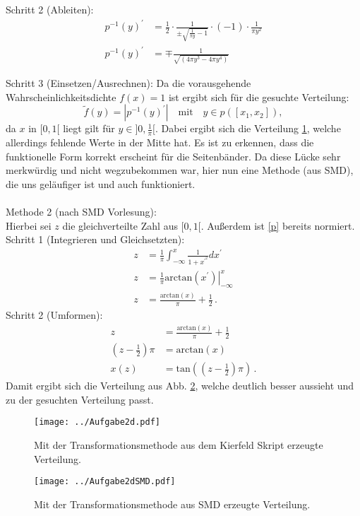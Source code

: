Schritt 2 (Ableiten):
\begin{align*}
	p^{-1}(y)^{'} &= \frac{1}{2} \cdot \frac{1}{\pm \sqrt{\frac{1}{\pi y} - 1}} \cdot (-1) \cdot \frac{1}{\pi y^2}\\
	p^{-1}(y)^{'} &= \mp \frac{1}{\sqrt{(4\pi y^3-4\pi y^4)}}
\end{align*}

Schritt 3 (Einsetzen/Ausrechnen):
Da die vorausgehende Wahrscheinlichkeitsdichte $f(x) = 1$ ist ergibt sich für die gesuchte Verteilung:
\begin{equation*}
	\tilde{f}(y) = |p^{-1}(y)^{'}| \quad \text{mit} \quad y \in p([x_1,x_2]),
\end{equation*}
da $x$ in $[0,1[$ liegt gilt für $y \in ]0, \frac{1}{\pi}[$.
Dabei ergibt sich die Verteilung \ref{2d1}, welche allerdings fehlende Werte in der Mitte hat.
Es ist zu erkennen, dass die funktionelle Form korrekt erscheint für die Seitenbänder.
Da diese Lücke sehr merkwürdig und nicht wegzubekommen war, hier nun eine Methode (aus SMD), die uns geläufiger ist und auch funktioniert.
~\\
~\\
Methode 2 (nach SMD Vorlesung):\\
Hierbei sei $z$ die gleichverteilte Zahl aus $[0,1[$.
Außerdem ist \eqref{p} bereits normiert.
\\
Schritt 1 (Integrieren und Gleichsetzten):
\begin{align*}
	z &= \frac{1}{\pi} \int_{-\infty}^{x} \frac{1}{1+x^{'^2}} dx^{'}\\
	z &= \frac{1}{\pi} \left. \mathrm{arctan}(x^{'}) \right \vert_{-\infty}^{x}\\
	z &= \frac{\mathrm{arctan}(x)}{\pi} + \frac{1}{2} \, .
\end{align*}
Schritt 2 (Umformen):
\begin{align*}
	z &= \frac{\mathrm{arctan}(x)}{\pi} + \frac{1}{2}\\
	\left( z- \frac{1}{2} \right) \pi &= \mathrm{arctan}(x)\\
	x(z) &= \mathrm{tan}\left(\left( z- \frac{1}{2} \right)\pi\right) \, .
\end{align*}
Damit ergibt sich die Verteilung aus Abb. \ref{2d2}, welche deutlich besser aussieht und zu der gesuchten Verteilung passt.
\begin{figure}
	\centering
	\texttt{[image: ../Aufgabe2d.pdf]}
	\caption{Mit der Transformationsmethode aus dem Kierfeld Skript erzeugte Verteilung.}
	\label{2d1}
\end{figure}

\begin{figure}
	\centering
	\texttt{[image: ../Aufgabe2dSMD.pdf]}
	\caption{Mit der Transformationsmethode aus SMD erzeugte Verteilung.}
	\label{2d2}
\end{figure}